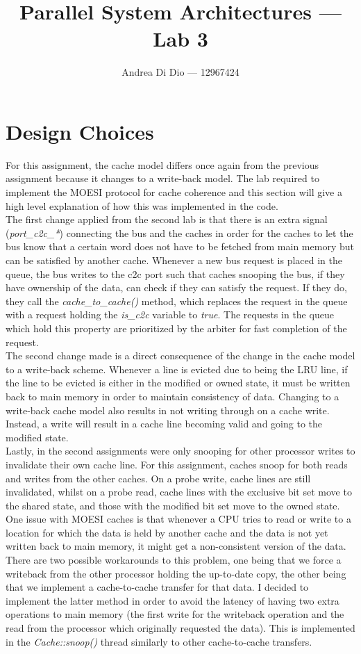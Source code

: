 \documentclass[]{article}
\title{Parallel System Architectures --- Lab 3}
\author{Andrea Di Dio --- 12967424}
\begin{document}
\maketitle

\section{Design Choices}

For this assignment, the cache model differs once again from the previous assignment because it changes to a write-back model. The lab required to implement the MOESI protocol for cache coherence and this section will give a high level explanation of how this was implemented in the code.\\
The first change applied from the second lab is that there is an extra signal (\textit{port\_c2c\_*}) connecting the bus and the caches in order for the caches to let the bus know that a certain word does not have to be fetched from main memory but can be satisfied by another cache. Whenever a new bus request is placed in the queue, the bus writes to the c2c port such that caches snooping the bus, if they have ownership of the data, can check if they can satisfy the request. If they do, they call the \textit{cache\_to\_cache()} method, which replaces the request in the queue with a request holding the \textit{is\_c2c} variable to \textit{true}. The requests in the queue which hold this property are prioritized by the arbiter for fast completion of the request.\\
The second change made is a direct consequence of the change in the cache model to a write-back scheme. Whenever a line is evicted due to being the LRU line, if the line to be evicted is either in the modified or owned state, it must be written back to main memory in order to maintain consistency of data. Changing to a write-back cache model also results in not writing through on a cache write. Instead, a write will result in a cache line becoming valid and going to the modified state.\\
Lastly, in the second assignments were only snooping for other processor writes to invalidate their own cache line. For this assignment, caches snoop for both reads and writes from the other caches. On a probe write, cache lines are still invalidated, whilst on a probe read, cache lines with the exclusive bit set move to the shared state, and those with the modified bit set move to the owned state.\\
One issue with MOESI caches is that whenever a CPU tries to read or write to a location for which the data is held by another cache and the data is not yet written back to main memory, it might get a non-consistent version of the data. There are two possible workarounds to this problem, one being that we force a writeback from the other processor holding the up-to-date copy, the other being that we implement a cache-to-cache transfer for that data. I decided to implement the latter method in order to avoid the latency of having two extra operations to main memory (the first write for the writeback operation and the read from the processor which originally requested the data). This is implemented in the \textit{Cache::snoop()} thread similarly to other cache-to-cache transfers.
\end{document}

